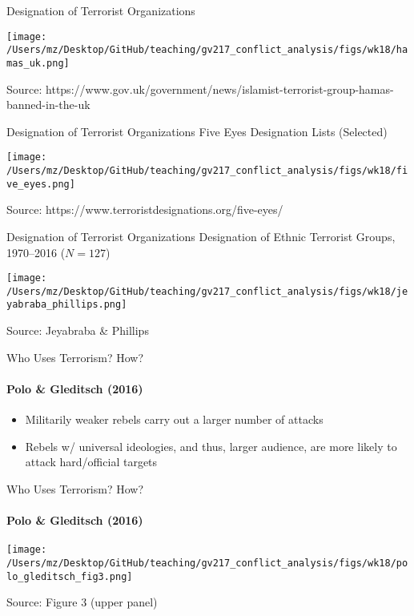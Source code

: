 \documentclass{beamer}
\begin{document}
\begin{frame}{Designation of Terrorist Organizations}
    \pause
    \begin{center}
        \texttt{[image: /Users/mz/Desktop/GitHub/teaching/gv217\_conflict\_analysis/figs/wk18/hamas\_uk.png]}
    \end{center}
    \footnotesize Source: https://www.gov.uk/government/news/islamist-terrorist-group-hamas-banned-in-the-uk
\end{frame}

\begin{frame}{Designation of Terrorist Organizations}
    \pause
    Five Eyes Designation Lists (Selected)
    \begin{center}
        \texttt{[image: /Users/mz/Desktop/GitHub/teaching/gv217\_conflict\_analysis/figs/wk18/five\_eyes.png]}
    \end{center}
    \footnotesize Source: https://www.terroristdesignations.org/five-eyes/
\end{frame}

\begin{frame}{Designation of Terrorist Organizations}
    \pause
    Designation of Ethnic Terrorist Groups, 1970--2016 (\(N = 127\))
    \begin{center}
        \texttt{[image: /Users/mz/Desktop/GitHub/teaching/gv217\_conflict\_analysis/figs/wk18/jeyabraba\_phillips.png]}
    \end{center}
    \footnotesize Source: Jeyabraba \& Phillips
\end{frame}

\begin{frame}{Who Uses Terrorism? How?}
\framesubtitle{Polo \& Gleditsch (2016)}
    \begin{itemize}
        \pause\item Militarily weaker rebels carry out a larger number of attacks
        \pause\item Rebels w/ universal ideologies, and thus, larger audience, are more likely to attack hard/official targets
\end{itemize}
\end{frame}

\begin{frame}{Who Uses Terrorism? How?}
\framesubtitle{Polo \& Gleditsch (2016)}
    \pause
    \begin{center}
        \texttt{[image: /Users/mz/Desktop/GitHub/teaching/gv217\_conflict\_analysis/figs/wk18/polo\_gleditsch\_fig3.png]}
    \end{center}
    \footnotesize Source: Figure 3 (upper panel)
\end{frame}
\end{document}
